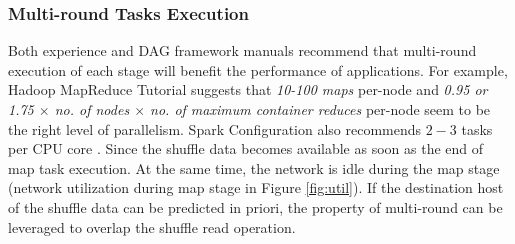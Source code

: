 \subsubsection{Multi-round Tasks Execution}\label{multi}
Both experience and DAG framework manuals recommend that multi-round execution of each stage will benefit the performance of applications.
For example, Hadoop MapReduce Tutorial \cite{hadooptutorial} suggests that \textit{10-100 maps} per-node and \textit{0.95 or 1.75 $\times$ no. of nodes $\times$ no. of maximum container reduces} per-node seem to be the right level of parallelism. 
Spark Configuration also recommends $2-3$ tasks per CPU core \cite{sparkconf}.
Since the shuffle data becomes available as soon as the end of map task execution. 
At the same time, the network is idle during the map stage (network utilization during map stage in Figure \ref{fig:util}). 
If the destination host of the shuffle data can be predicted in priori, the property of multi-round can be leveraged to overlap the shuffle read operation.

